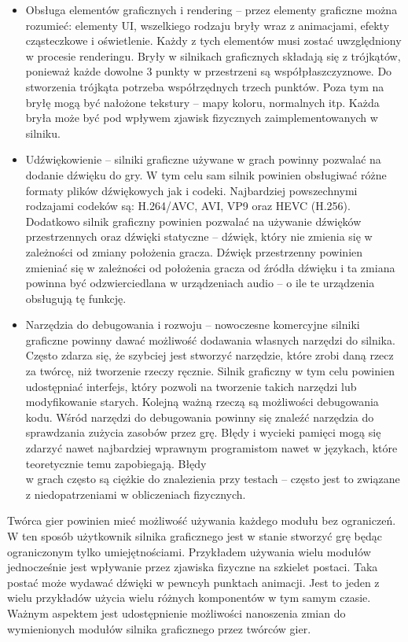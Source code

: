 \documentclass[12pt,twoside]{article}
\begin{document}
\begin{itemize}
\item Obsługa elementów graficznych i rendering -- przez elementy graficzne
można rozumieć: elementy UI, wszelkiego rodzaju bryły wraz z animacjami, efekty
cząsteczkowe i oświetlenie. Każdy z tych elementów musi zostać uwzględniony w
procesie renderingu. Bryły w silnikach graficznych składają się z trójkątów,
ponieważ każde dowolne 3 punkty w przestrzeni są współpłaszczyznowe.  Do
stworzenia trójkąta potrzeba współrzędnych trzech punktów. Poza tym na bryłę
mogą być nałożone tekstury – mapy koloru, normalnych itp. Każda bryła może być
pod wpływem zjawisk fizycznych zaimplementowanych w silniku. 

\item Udźwiękowienie -- silniki graficzne używane w grach powinny pozwalać na
dodanie dźwięku do gry. W tym celu sam silnik powinien obsługiwać różne formaty
plików dźwiękowych jak i codeki. Najbardziej powszechnymi rodzajami codeków są:
H.264/AVC, AVI, VP9 oraz HEVC (H.256). Dodatkowo silnik graficzny powinien
pozwalać na używanie dźwięków przestrzennych oraz dźwięki statyczne -- dźwięk,
który nie zmienia się w zależności od zmiany położenia gracza. Dźwięk
przestrzenny powinien zmieniać się w zależności od położenia gracza od źródła
dźwięku i ta zmiana powinna być odzwierciedlana w urządzeniach audio – o ile te
urządzenia obsługują tę funkcję. 

\item Narzędzia do debugowania i rozwoju -- nowoczesne komercyjne
silniki graficzne powinny dawać możliwość dodawania własnych narzędzi do
silnika. Często zdarza się, że szybciej jest stworzyć narzędzie, które zrobi
daną rzecz za twórcę, niż tworzenie rzeczy ręcznie. Silnik graficzny w tym celu
powinien udostępniać interfejs, który pozwoli na tworzenie takich narzędzi lub
modyfikowanie starych. Kolejną ważną rzeczą są możliwości debugowania kodu.
Wśród narzędzi do debugowania powinny się znaleźć narzędzia do sprawdzania
zużycia zasobów przez grę. Błędy i wycieki pamięci mogą się zdarzyć nawet
najbardziej wprawnym programistom nawet w językach, które teoretycznie temu
zapobiegają. Błędy\\w grach często są ciężkie do znalezienia przy testach
-- często jest to związane\\z niedopatrzeniami w obliczeniach
fizycznych. 

\end{itemize}

Twórca gier powinien mieć możliwość używania każdego modułu bez ograniczeń. W
ten sposób użytkownik silnika graficznego jest w stanie stworzyć grę będąc
ograniczonym tylko umiejętnościami. Przykładem używania wielu modułów
jednocześnie jest wpływanie przez zjawiska fizyczne na szkielet postaci. Taka
postać może wydawać dźwięki w pewncyh punktach animacji. Jest to jeden z wielu
przykładów użycia wielu różnych komponentów w tym samym czasie. Ważnym aspektem
jest udostępnienie możliwości nanoszenia zmian do wymienionych modułów silnika
graficznego przez twórców gier. 
\end{document}
